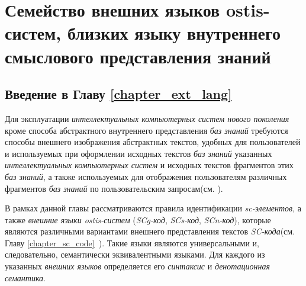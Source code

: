 \chapter{Семейство внешних языков ostis-систем, близких языку внутреннего смыслового представления знаний}
\label{chapter_ext_lang}

\vspace{-7\baselineskip}
\begin{SCn}


\end{SCn}

\section*{Введение в Главу \ref{chapter_ext_lang}}

Для эксплуатации \textit{интеллектуальных компьютерных систем нового поколения} кроме способа абстрактного внутреннего представления \textit{баз знаний} требуются способы внешнего изображения абстрактных текстов, удобных для пользователей и используемых при оформлении исходных текстов \textit{баз знаний} указанных \textit{интеллектуальных компьютерных систем} и исходных текстов фрагментов этих \textit{баз знаний}, а также используемых для отображения пользователям различных фрагментов \textit{баз знаний} по пользовательским запросам(см. ).

В рамках данной главы рассматриваются правила идентификации \textit{sc-элементов}, а также \textit{внешние языки ostis-систем} (\textit{SCg-код}, \textit{SCs-код}, \textit{SCn-код}), которые являются различными вариантами внешнего представления текстов \textit{SC-кода}(см. Главу \ref{chapter_sc_code}~). Такие языки являются универсальными и, следовательно, семантически эквивалентными языками. Для каждого из указанных \textit{внешних языков} определяется его \textit{синтаксис} и \textit{денотационная семантика}.

